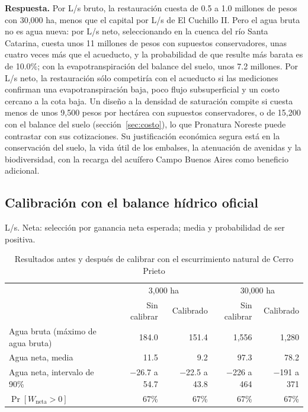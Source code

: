 \documentclass[11pt,letterpaper]{article}
\newcommand{\respuesta}[1]{\begin{cajarespuesta}\textbf{\color{naranja}Respuesta.} #1\end{cajarespuesta}}
\begin{document}
\respuesta{Por L/s bruto, la restauración cuesta de 0.5 a 1.0 millones de pesos con 30,000 ha, menos que el capital por L/s de El Cuchillo II. Pero el agua bruta no es agua nueva: por L/s neto, seleccionando en la cuenca del río Santa Catarina, cuesta unos 11 millones de pesos con supuestos conservadores, unas cuatro veces más que el acueducto, y la probabilidad de que resulte más barata es de 10.0\%; con la evapotranspiración del balance del suelo, unos 7.2 millones. Por L/s neto, la restauración sólo competiría con el acueducto si las mediciones confirman una evapotranspiración baja, poco flujo subsuperficial y un costo cercano a la cota baja. Un diseño a la densidad de saturación compite si cuesta menos de unos 9,500 pesos por hectárea con supuestos conservadores, o de 15,200 con el balance del suelo (sección~\ref{sec:costo}), lo que Pronatura Noreste puede contrastar con sus cotizaciones. Su justificación económica segura está en la conservación del suelo, la vida útil de los embalses, la atenuación de avenidas y la biodiversidad, con la recarga del acuífero Campo Buenos Aires como beneficio adicional.}

\subsection{Calibración con el balance hídrico oficial}\label{res:calibracion}

\begin{table}[H]\centering\small
\caption{Resultados antes y después de calibrar con el escurrimiento natural de Cerro Prieto}\label{tab:calibracion}
{\color{gris}L/s. Neta: selección por ganancia neta esperada; media y probabilidad de ser positiva.\par}\smallskip
\begin{tabularx}{\linewidth}{Xrrrr}
\toprule
 & \multicolumn{2}{c}{3,000 ha} & \multicolumn{2}{c}{30,000 ha} \\
 & Sin calibrar & Calibrado & Sin calibrar & Calibrado \\
\midrule
Agua bruta (máximo de agua bruta) & 184.0 & 151.4 & 1,556 & 1,280 \\
Agua neta, media & 11.5 & 9.2 & 97.3 & 78.2 \\
Agua neta, intervalo de 90\% & −26.7 a 54.7 & −22.5 a 43.8 & −226 a 464 & −191 a 371 \\
$\Pr[W_{\text{neta}}>0]$ & 67\% & 67\% & 67\% & 67\% \\
\bottomrule
\end{tabularx}
\end{table}
\end{document}

